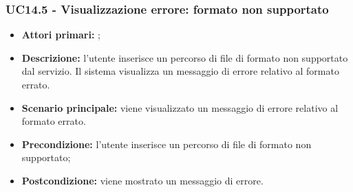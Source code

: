 \subsubsection{UC14.5 - Visualizzazione errore: formato non supportato}
\begin{itemize}
	\item \textbf{Attori primari:} \us{};
	\item \textbf{Descrizione:} l’utente inserisce un percorso di file di formato non supportato dal servizio. Il sistema visualizza un messaggio di errore relativo al formato errato.
	\item \textbf{Scenario principale:} viene visualizzato un messaggio di errore relativo al formato errato.
	\item \textbf{Precondizione:} l'utente inserisce un percorso di file di formato non supportato;
	\item \textbf{Postcondizione:} viene mostrato un messaggio di errore. 
\end{itemize}